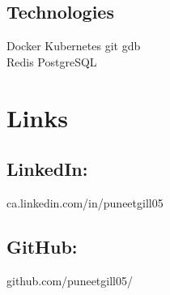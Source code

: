 \documentclass[]{deedy-resume-openfont}
\begin{document}
\begin{minipage}[t]{0.31\textwidth}
\subsection{Technologies}
Docker \textbullet{} Kubernetes \textbullet{} git \textbullet{} gdb \\
Redis \textbullet{} PostgreSQL

\section{Links}
\subsection{LinkedIn:}
ca.linkedin.com/in/puneetgill05 \\
\subsection{GitHub:}
github.com/puneetgill05/
%
%

\end{minipage} 
\hfill
\end{document}
